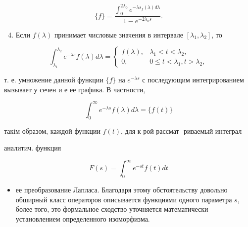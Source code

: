 \documentclass[10pt]{article}
\begin{document}
\[

\{f\}=\frac{\int_{0}^{2 \lambda_{0}} e^{-\lambda s_{f}(\lambda) d \lambda}}{1-e^{-2 \lambda_{0} s}} .

\]



\begin{enumerate}

  \setcounter{enumi}{3}

  \item Если $f(\lambda)$ принимает числовые значения в интервале $\left[\lambda_{1}, \lambda_{2}\right]$, то

\end{enumerate}



\[

\int_{\lambda_{1}}^{\lambda_{2}} e^{-\lambda s} f(\lambda) d \lambda=\left\{\begin{array}{cl}

f(\lambda), & \lambda_{1}<t<\lambda_{2}, \\

0, & 0 \leqslant t<\lambda_{1}, t>\lambda_{2},

\end{array}\right.

\]



т. е. умножение данной функции $\{f\}$ на $e^{-\lambda s}$ с последующим интегрированием вызывает у сечен и е ее графика. В частности,



\[

\int_{0}^{\infty} e^{-\lambda s} f(\lambda) d \lambda=\{f(t)\}

\]



такім образом, каждой функции $f(t)$, для к-рой рассмат- риваемый интеграл

аналитич. функция



\[

F(s)=\int_{0}^{\infty} e^{-s t} f(t) d t

\]



\begin{itemize}

  \item ее преобразование Лапласа. Благодаря этому обстоятельству довольно обширный класс операторов описывается функциями одного параметра $s$, более того, это формальное сходство уточняется математически установлением определенного изоморфизма.

\end{itemize}
\end{document}

